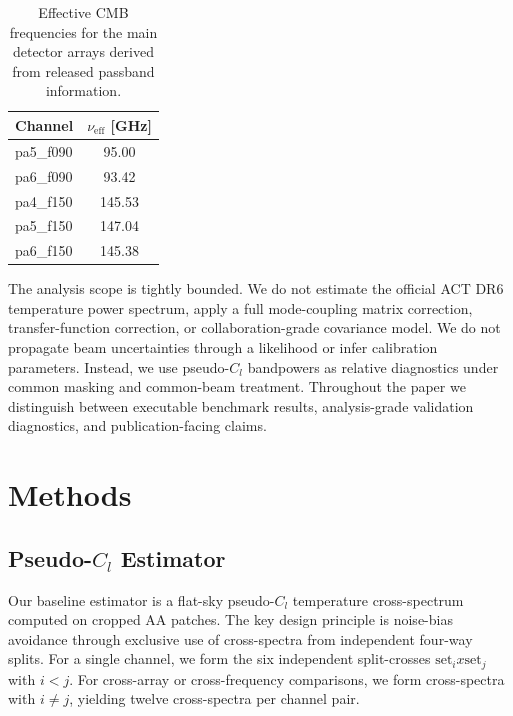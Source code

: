 \documentclass[twocolumn,showpacs,preprintnumbers,amsmath,amssymb,floatfix,prd]{revtex4-2}
\def\ell{l}%
\def\times{x}%
\begin{document}
\begin{table}[t]
\centering
\caption{Effective CMB frequencies for the main detector arrays derived from released passband information.}
\label{tab:efffreq}
\begin{tabular}{lc}
\toprule
Channel & $\nu_\mathrm{eff}$ [GHz] \\
\midrule
pa5\_f090 & 95.00 \\
pa6\_f090 & 93.42 \\
pa4\_f150 & 145.53 \\
pa5\_f150 & 147.04 \\
pa6\_f150 & 145.38 \\
\bottomrule
\end{tabular}
\end{table}

The analysis scope is tightly bounded.
We do not estimate the official ACT DR6 temperature power spectrum, apply a full mode-coupling matrix correction, transfer-function correction, or collaboration-grade covariance model.
We do not propagate beam uncertainties through a likelihood or infer calibration parameters.
Instead, we use pseudo-$C_\ell$ bandpowers as relative diagnostics under common masking and common-beam treatment.
Throughout the paper we distinguish between executable benchmark results, analysis-grade validation diagnostics, and publication-facing claims.

\section{Methods}\label{sec:methods}

\subsection{Pseudo-$C_\ell$ Estimator}\label{sec:pcl}

Our baseline estimator is a flat-sky pseudo-$C_\ell$ temperature cross-spectrum computed on cropped AA patches.
The key design principle is noise-bias avoidance through exclusive use of cross-spectra from independent four-way splits.
For a single channel, we form the six independent split-crosses $\mathrm{set}_i \times \mathrm{set}_j$ with $i < j$.
For cross-array or cross-frequency comparisons, we form cross-spectra with $i \neq j$, yielding twelve cross-spectra per channel pair.
\end{document}
